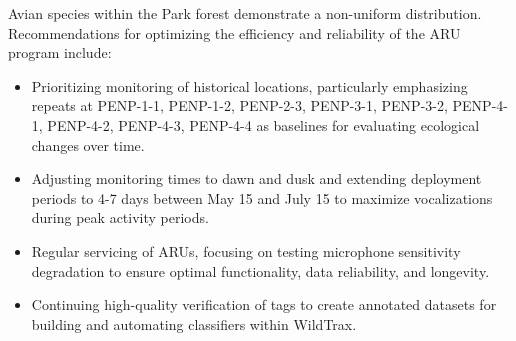 \documentclass[
  letterpaper,
  DIV=11,
  numbers=noendperiod,
  oneside]{scrartcl}
\providecommand{\tightlist}{%
  \setlength{\itemsep}{0pt}\setlength{\parskip}{0pt}}\usepackage{longtable,booktabs,array}
\begin{document}
Avian species within the Park forest demonstrate a non-uniform
distribution. Recommendations for optimizing the efficiency and
reliability of the ARU program include:

\begin{itemize}
\tightlist
\item
  Prioritizing monitoring of historical locations, particularly
  emphasizing repeats at PENP-1-1, PENP-1-2, PENP-2-3, PENP-3-1,
  PENP-3-2, PENP-4-1, PENP-4-2, PENP-4-3, PENP-4-4 as baselines for
  evaluating ecological changes over time.
\item
  Adjusting monitoring times to dawn and dusk and extending deployment
  periods to 4-7 days between May 15 and July 15 to maximize
  vocalizations during peak activity periods.
\item
  Regular servicing of ARUs, focusing on testing microphone sensitivity
  degradation to ensure optimal functionality, data reliability, and
  longevity.
\item
  Continuing high-quality verification of tags to create annotated
  datasets for building and automating classifiers within WildTrax.
\end{itemize}
\end{document}
